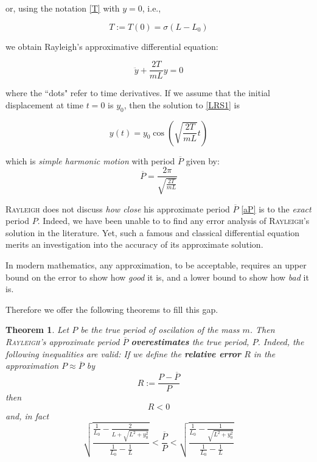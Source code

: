 \documentclass[12pt]{article}
\newtheorem{thm}{Theorem}
\numberwithin{equation}{section}
\begin{document}
\noindent or, using the notation \eqref{T} with $y=0$, i.e., 

$$T:=T(0)=\sigma (L-L_0)$$ 

\noindent we obtain Rayleigh's approximative differential equation:


\begin{equation}
\label{LRS1}
\boxed{\ddot{y}+\frac{2T}{mL}y=0}
\end{equation}

\noindent where the ``dots" refer to time derivatives.  If we assume that the initial displacement at time $t=0$ is $y_0$, then  the solution to \eqref{LRS1} is 

\begin{equation}
\label{as}
\boxed{y(t)=y_0\cos\left(\sqrt{\frac{2T}{mL}}t\right)}
\end{equation}

\noindent which is \emph{simple harmonic motion} with period $\overline{P}$ given by:
\begin{equation}
\label{aP}
\boxed{\overline{P}=\frac{2\pi}{\sqrt{\frac{2T}{mL}}}}
\end{equation}

\textsc{Rayleigh} does not discuss \emph{how close} his approximate period $\overline{P}$ \eqref{aP} is to the \emph{exact} period $P$.  Indeed, we have been unable to to find any error analysis of \textsc{Rayleigh}'s solution in the literature.  Yet, such a famous and classical differential equation merits an investigation into the accuracy of its approximate solution.

In modern mathematics, any approximation, to be acceptable, requires an upper bound on the error to show how \emph{good} it is, and a lower bound to show how \emph{bad} it is.

Therefore we offer the following theorems to fill this gap.

\begin{thm}
\label{bounds}
Let $P$ be the true period of oscilation of the mass $m$.  Then \textsc{Rayleigh}'s approximate period $\overline{P}$ \textbf{\emph{overestimates}} the true period, $P$.  Indeed, the following inequalities are valid:  If we define the \textbf{relative error} $R$ in the approximation $P\approx\overline{P}$ by
$$
R:=\frac{P-\overline{P}}{P}
$$
then
$$
R<0
$$
and, in fact
\begin{equation}
\label{Bounds}
\boxed{ \sqrt{\frac{\frac{1}{L_0}-\frac{2}{L+\sqrt{L^2+y_0^2}}}{\frac{1}{L_0}-\frac{1}{L}}}<\frac{\overline{P}}{P}<\sqrt{\frac{\frac{1}{L_0}-\frac{1}{\sqrt{L^2+y_0^2}}}{\frac{1}{L_0}-\frac{1}{L}}}}
\end{equation}
\end{thm}
\end{document}
